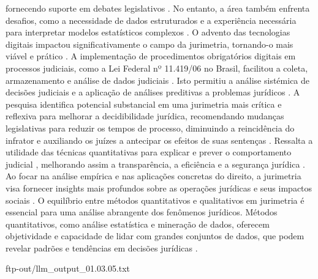 \begin{agradecimentos}
fornecendo suporte em debates legislativos \cite{nunes2016jurimetria, por2013}. No entanto, a área também enfrenta desafios, como a necessidade de dados estruturados e a experiência necessária para interpretar modelos estatísticos complexos \cite{103390fi9040068, l2010de}. O advento das tecnologias digitais impactou significativamente o campo da jurimetria, tornando-o mais viável e prático \cite{silva2023role, 103390fi9040068}. A implementação de procedimentos obrigatórios digitais em processos judiciais, como a Lei Federal nº 11.419/06 no Brasil, facilitou a coleta, armazenamento e análise de dados judiciais \cite{103390fi9040068}. Isto permitiu a análise sistémica de decisões judiciais e a aplicação de análises preditivas a problemas jurídicos \cite{silva2023role, 103390fi9040068}. A pesquisa identifica potencial substancial em uma jurimetria mais crítica e reflexiva para melhorar a decidibilidade jurídica, recomendando mudanças legislativas para reduzir os tempos de processo, diminuindo a reincidência do infrator e auxiliando os juízes a antecipar os efeitos de suas sentenças \cite{nunes2018}. Ressalta a utilidade das técnicas quantitativas para explicar e prever o comportamento judicial \cite{luvizotto2020}, melhorando assim a transparência, a eficiência e a segurança jurídica \cite{silva2023}. Ao focar na análise empírica e nas aplicações concretas do direito, a jurimetria visa fornecer insights mais profundos sobre as operações jurídicas e seus impactos sociais \cite{nunes2018}. O equilíbrio entre métodos quantitativos e qualitativos em jurimetria é essencial para uma análise abrangente dos fenômenos jurídicos. Métodos quantitativos, como análise estatística e mineração de dados, oferecem objetividade e capacidade de lidar com grandes conjuntos de dados, que podem revelar padrões e tendências em decisões jurídicas \cite{10.1177/0094306118767649,de2010jurimetrics}. 
    
    ftp-out/llm_output_01.03.05.txt 
    

\end{agradecimentos}
